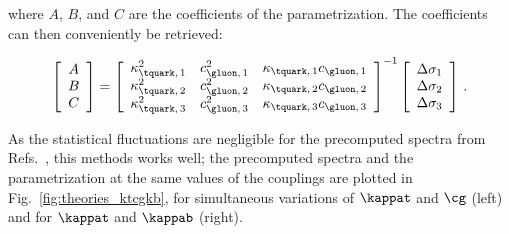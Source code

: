 % 
where $A$, $B$, and $C$ are the coefficients of the parametrization.
% 
The coefficients can then conveniently be retrieved:
% 
\begin{linenomath*}
\begin{equation}
\left[\begin{array}{c}
A \\
B \\
C
\end{array}\right]
=
    \left[\begin{array}{ccc}
        \kappa_{\tquark,\,1}^2  &  c_{\gluon,\,1}^2   &  \kappa_{\tquark,\,1} c_{\gluon,\,1} \\
        \kappa_{\tquark,\,2}^2  &  c_{\gluon,\,2}^2   &  \kappa_{\tquark,\,2} c_{\gluon,\,2} \\
        \kappa_{\tquark,\,3}^2  &  c_{\gluon,\,3}^2   &  \kappa_{\tquark,\,3} c_{\gluon,\,3}
        \end{array}\right]^{-1}
    \left[\begin{array}{c}
        \Delta\sigma_1 \\
        \Delta\sigma_2 \\
        \Delta\sigma_3
        \end{array}\right]
    \,.
\end{equation}
\end{linenomath*}
% 
As the statistical fluctuations are negligible for the precomputed spectra from Refs.~\cite{Grazzini:2017szg,Grazzini:2016paz}, this methods works well; the precomputed spectra and the parametrization at the same values of the couplings are plotted in Fig.~\ref{fig:theories_ktcgkb}, for simultaneous variations of $\kappat$ and $\cg$ (left) and for $\kappat$ and $\kappab$ (right).


